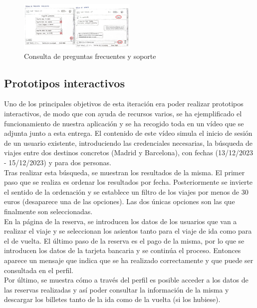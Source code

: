 \begin{figure}[H]
    \centering
    \includegraphics[width=0.5\textwidth]{Imagenes/Keypath/Isabel8.png}
    \caption{Consulta de preguntas frecuentes y soporte}
    \label{fig:Isabel8}
\end{figure}

\subsection{Prototipos interactivos}
Uno de los principales objetivos de esta iteración era poder realizar prototipos interactivos, de modo que con ayuda de recursos varios, se ha ejemplificado el funcionamiento
de nuestra aplicación y se ha recogido toda en un vídeo que se adjunta junto a esta entrega. El contenido de este vídeo simula el inicio de sesión de un usuario existente,
introduciendo las credenciales necesarias, la búsqueda de viajes entre dos destinos concretos (Madrid y Barcelona), con fechas (13/12/2023 - 15/12/2023) y para dos personas. \\

Tras realizar esta búsqueda, se muestran los resultados de la misma. El primer paso que se realiza es ordenar los resultados por fecha. Posteriormente se invierte el sentido
de la ordenación y se establece un filtro de los viajes por menos de 30 euros (desaparece una de las opciones). Las dos únicas opciones son las que finalmente son seleccionadas. \\

En la página de la reserva, se introducen los datos de los usuarios que van a realizar el viaje y se seleccionan los asientos tanto para el viaje de ida como para el de
vuelta. El último paso de la reserva es el pago de la misma, por lo que se introducen los datos de la tarjeta bancaria y se continúa el proceso. Entonces aparece un mensaje
que indica que se ha realizado correctamente y que puede ser consultada en el perfil. \\

Por último, se muestra cómo a través del perfil es posible acceder a los datos de las reservas realizadas y así poder consultar la información de la misma y descargar los
billetes tanto de la ida como de la vuelta (si los hubiese).

